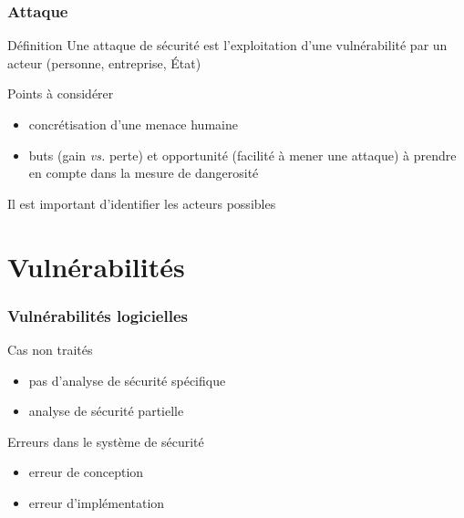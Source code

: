 \begin{reveals}
\begin{frame}
  \frametitle{Attaque}

  \vfill
  \begin{block}{Définition}
  Une attaque de sécurité est l'exploitation d'une vulnérabilité
  par un acteur (personne, entreprise, État)
  \end{block}
  \vfill
  \begin{block}{Points à considérer}
    \begin{itemize}
    \item concrétisation d'une menace humaine
    \item buts (gain \textit{vs.} perte) et opportunité (facilité à
      mener une attaque) à prendre en compte dans la mesure de dangerosité
    \end{itemize}
  \end{block}


  \vfill

  \begin{center}
  \alert{Il est important d'identifier les acteurs possibles}
  \end{center}
  
  \vfill

\end{frame}

\section{Vulnérabilités}

\begin{frame}
  \frametitle{Vulnérabilités logicielles}

  \vfill

  \begin{block}{Cas non traités}
    \begin{itemize}
    \item pas d'analyse de sécurité spécifique
    \item analyse de sécurité partielle
    \end{itemize}
  \end{block}

  \pause\vfill

  \begin{block}{Erreurs dans le système de sécurité}
    \begin{itemize}
    \item erreur de conception
    \item erreur d'implémentation
    \end{itemize}
  \end{block}


\end{frame}
\end{reveals}
